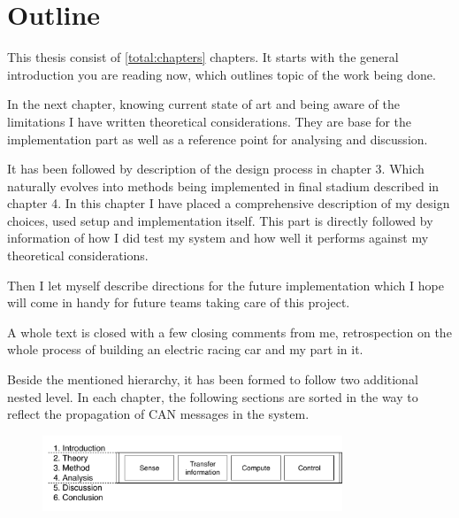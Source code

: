 

\section{Outline}
This thesis consist of \ref{total:chapters} chapters. It starts with the general introduction you are reading now, which outlines topic of the work being done.

In the next chapter, knowing current state of art and being aware of the limitations I have written theoretical considerations. They are base for the implementation part as well as a reference point for analysing and discussion.

It has been followed by description of the design process in chapter 3. Which naturally evolves into methods being implemented in final stadium described in chapter 4. In this chapter I have placed a comprehensive description of my design choices, used setup and implementation itself. This part is directly followed by information of how I did test my system and how well it performs against my theoretical considerations.

Then I let myself describe directions for the future implementation which I hope will come in handy for future teams taking care of this project.

A whole text is closed with a few closing comments from me, retrospection on the whole process of building an electric racing car and my part in it.

Beside the mentioned hierarchy, it has been formed to follow two additional nested level. In each chapter, the following sections are sorted in the way to reflect the propagation of CAN messages in the system.

\begin{figure}[h]
    \centering
            \includegraphics[width=0.8\textwidth]{figures/Outline}
            \label{outline}
\end{figure}